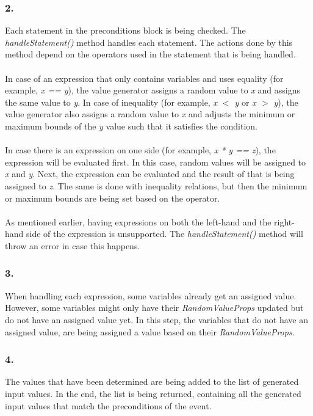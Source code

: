 \subsubsection{2. }
Each statement in the preconditions block is being checked. The
\textit{handleStatement()} method handles each statement. The actions done by
this method depend on the operators used in the statement that is being
handled.\\
\\
In case of an expression that only contains variables and uses equality
(for example, \textit{x == y}), the value generator assigns a random value to
\textit{x} and assigns the same value to \textit{y}. In case of inequality
(for example, \textit{x $<$ y} or \textit{x $>$ y}), the value generator also assigns a random value to
\textit{x} and adjusts the minimum or maximum bounds of the \textit{y} value
such that it satisfies the condition.\\
\\
In case there is an expression on one side (for example, \textit{x * y == z}),
the expression will be evaluated first. In this case, random values will be
assigned to \textit{x} and \textit{y}. Next, the expression can be evaluated and
the result of that is being assigned to \textit{z}. The same is done with
inequality relations, but then the minimum or maximum bounds are being set based
on the operator.\\
\\
As mentioned earlier, having expressions on both the left-hand and the
right-hand side of the expression is unsupported. The \textit{handleStatement()}
method will throw an error in case this happens.

\subsubsection{3. }
When handling each expression, some variables already get an assigned value.
However, some variables might only have their \textit{RandomValueProps} updated
but do not have an assigned value yet. In this step, the variables that do not
have an assigned value, are being assigned a value based on their
\textit{RandomValueProps}.

\subsubsection{4. }
The values that have been determined are being added to the list of generated
input values. In the end, the list is being returned, containing all the
generated input values that match the preconditions of the event.

